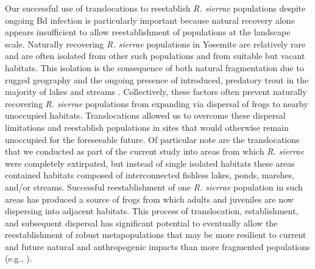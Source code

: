\documentclass[
  letterpaper,
  DIV=11,
  numbers=noendperiod]{scrartcl}
\begin{document}
Our successful use of translocations to reestablish \emph{R. sierrae}
populations despite ongoing Bd infection is particularly important
because natural recovery alone appears insufficient to allow
reestablishment of populations at the landscape scale. Naturally
recovering \emph{R. sierrae} populations in Yosemite are relatively rare
and are often isolated from other such populations and from suitable but
vacant habitats. This isolation is the consequence of both natural
fragmentation due to rugged geography and the ongoing presence of
introduced, predatory trout in the majority of lakes and streams
\citep{bradford1993}. Collectively, these factors often prevent
naturally recovering \emph{R. sierrae} populations from expanding via
dispersal of frogs to nearby unoccupied habitats. Translocations allowed
us to overcome these dispersal limitations and reestablish populations
in sites that would otherwise remain unoccupied for the foreseeable
future. Of particular note are the translocations that we conducted as
part of the current study into areas from which \emph{R. sierrae} were
completely extirpated, but instead of single isolated habitats these
areas contained habitats composed of interconnected fishless lakes,
ponds, marshes, and/or streams. Successful reestablishment of one
\emph{R. sierrae} population in such areas has produced a source of
frogs from which adults and juveniles are now dispersing into adjacent
habitats. This process of translocation, establishment, and subsequent
dispersal has significant potential to eventually allow the
reestablishment of robust metapopulations that may be more resilient to
current and future natural and anthropogenic impacts than more
fragmented populations (e.g., \citep{heard2015}).
\end{document}

